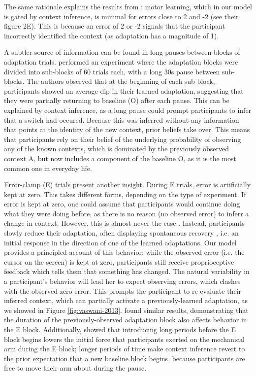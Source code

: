 \documentclass[a4paper,doc,floatsintext,natbib]{apa6}
\def \fref #1{Figure \ref{#1}}     %
\begin{document}
The same rationale explains the results from \cite{Davidson_Scaling_2004}: motor learning, which in our model is gated by context inference, is minimal for errors close to 2 and -2 (see their figure 2E). This is because an error of 2 or -2 signals that the participant incorrectly identified the context (as adaptation has a magnitude of 1).

A subtler source of information can be found in long pauses between blocks of adaptation trials. \cite{Ethier_Spontaneous_2008} performed an experiment where the adaptation blocks were divided into sub-blocks of 60 trials each, with a long 30s pause between sub-blocks. The authors observed that at the beginning of each sub-block, participants showed an average dip in their learned adaptation, suggesting that they were partially returning to baseline (O) after each pause. This can be explained by context inference, as a long pause could prompt participants to infer that a switch had occured. Because this was inferred without any information that points at the identity of the new context, prior beliefs take over. This means that participants rely on their belief of the underlying probability of observing any of the known contexts, which is dominated by the previously observed context A, but now includes a component of the baseline O, as it is the most common one in everyday life.

Error-clamp (E) trials present another insight. During E trials, error is artificially kept at zero. This takes different forms, depending on the type of experiment. If error is kept at zero, one could assume that participants would continue doing what they were doing before, as there is no reason (no observed error) to inferr a change in context. However, this is almost never the case \cite[e.g.][]{Smith_Interacting_2006,Ethier_Spontaneous_2008,Forano_Timescales_2020,Vaswani_Decay_2013,Scheidt_Persistence_2000,Pekny_Protection_2011}. Instead, participants slowly reduce their adaptation, often displaying spontaneous recovery \cite[e.g.][]{Smith_Interacting_2006}, i.e. an initial response in the direction of one of the learned adaptations. Our model provides a principled account of this behavior: while the observed error (i.e. the cursor on the screen) is kept at zero, participants still receive proprioceptive feedback which tells them that something has changed. The natural variability in a participant's behavior will lead her to expect observing errors, which clashes with the observed zero error. This prompts the participant to re-evaluate their inferred context, which can partially activate a previously-learned adaptation, as we showed in \fref{fig:vaswani-2013}. \cite{Pekny_Protection_2011} found similar results, demonstrating that the duration of the previously-observed adaptation block also affects behavior in the E block. Additionally, \cite{Criscimagna-Hemminger_Consolidation_2008} showed that introducing long periods before the E block begins lowers the initial force that participants exerted on the mechanical arm during the E block; longer periods of time make context inference revert to the prior expectation that a new baseline block begins, because participants are free to move their arm about during the pause.
\end{document}
